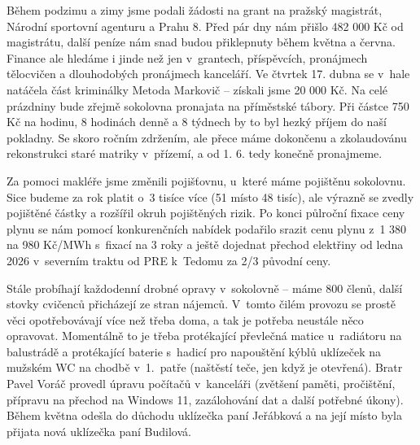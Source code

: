 \documentclass[11pt]{article}
\begin{document}
Během podzimu a zimy jsme podali žádosti na grant na pražský magistrát,
Národní
sportovní agenturu a Prahu 8. Před pár dny nám přišlo 482 000 Kč od
magistrátu,
další peníze nám snad budou přiklepnuty během května a června.
Finance ale hledáme i jinde než jen v~grantech, příspěvcích, pronájmech
tělocvičen
a dlouhodobých pronájmech kanceláří. Ve čtvrtek 17. dubna se v~hale
natáčela část
kriminálky Metoda Markovič -- získali jsme 20 000 Kč. Na celé prázdniny
bude
zřejmě sokolovna pronajata na příměstské tábory. Při částce 750 Kč na
hodinu, 8
hodinách denně a 8 týdnech by to byl hezký příjem do naší pokladny.
Se skoro ročním zdržením, ale přece máme dokončenu a zkolaudovánu
rekonstrukci staré matriky v~přízemí, a od 1. 6. tedy konečně
pronajmeme.

Za pomoci makléře jsme změnili pojišťovnu, u~které máme pojištěnu
sokolovnu.
Sice budeme za rok platit o~3 tisíce více (51 místo 48 tisíc), ale
výrazně se zvedly
pojištěné částky a rozšířil okruh pojištěných rizik.
Po konci půlroční fixace ceny plynu se nám pomocí konkurenčních nabídek
podařilo srazit
cenu plynu z~1 380 na 980 Kč/MWh s~fixací na 3 roky a ještě dojednat
přechod
elektřiny od ledna 2026 v~severním traktu od PRE k~Tedomu za 2/3 původní
ceny.

Stále probíhají každodenní drobné opravy v~sokolovně -- máme 800 členů,
další
stovky cvičenců přicházejí ze stran nájemců. V~tomto čilém provozu se
prostě věci
opotřebovávají více než třeba doma, a tak je potřeba neustále něco
opravovat.
Momentálně to je třeba protékající převlečná matice u~radiátoru na
balustrádě a
protékající baterie s~hadicí pro napouštění kýblů uklízeček na mužském
WC na
chodbě v~1.~patře (naštěstí teče, jen když je otevřená).
Bratr Pavel Voráč provedl úpravu počítačů v~kanceláři (zvětšení paměti,
pročištění,
přípravu na přechod na Windows 11, zazálohování dat a další potřebné
úkony).
Během května odešla do důchodu uklízečka paní Jeřábková a na její místo
byla
přijata nová uklízečka paní Budilová.
\end{document}
